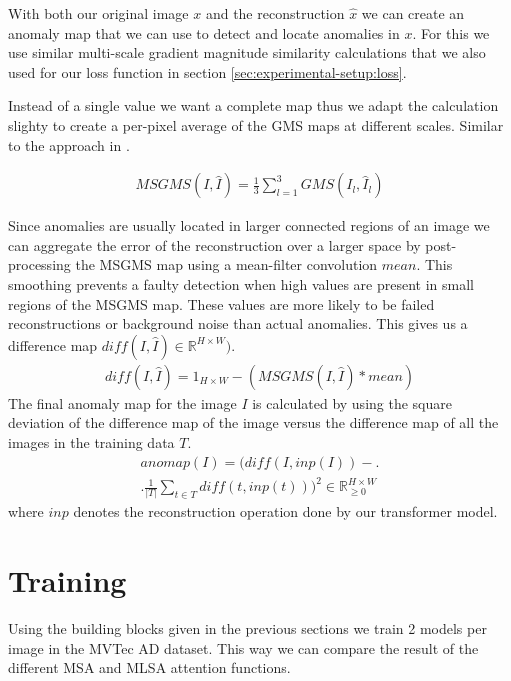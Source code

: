 With both our original image $x$ and the reconstruction $\hat{x}$ we can create an anomaly map that we can use to detect and locate anomalies in $x$. For this we use similar multi-scale gradient magnitude similarity calculations that we also used for our loss function in section \ref{sec:experimental-setup:loss}.

Instead of a single value we want a complete map thus we adapt the calculation slighty to create a per-pixel average of the GMS maps at different scales. Similar to the approach in \cite{pirnay_inpainting_2021, zavrtanik_reconstruction_2021}.

\begin{align}
MSGMS(I, \hat{I}) = \frac{1}{3} \sum_{l=1}^{3} {GMS(I_l, \hat{I}_l)}
\label{eq:experimental-setup:msgms}
\end{align}

Since anomalies are usually located in larger connected regions of an image we can aggregate the error of the reconstruction over a larger space by post-processing the MSGMS map using a mean-filter convolution $mean$. This smoothing prevents a faulty detection when high values are present in small regions of the MSGMS map. These values are more likely to be failed reconstructions or background noise than actual anomalies. This gives us a difference map $diff(I, \hat{I}) \in \mathbb{R}^{H \times W})$.
%
\begin{align}
diff(I, \hat{I}) = 1_{H \times W} - (MSGMS(I, \hat{I}) \ast mean)
\label{eq:experimental-setup:diff}
\end{align}
%
The final anomaly map for the image $I$ is calculated by using the square deviation of the difference map of the image versus the difference map of all the images in the training data $T$.
%
\begin{equation}
\begin{aligned}
anomap(I) = \biggl( {diff}(I, inp(I)) - \bigr. \\
\biggl. \frac{1}{|T|} \sum_{t \in T}{{diff}(t, inp(t))} \Bigr) ^ 2 \in \mathbb{R}_{\geq 0}^{H \times W}
\label{eq:experimental-setup:anomap}
\end{aligned}
\end{equation}
%
where $inp$ denotes the reconstruction operation done by our transformer model.

\section{Training}

Using the building blocks given in the previous sections we train 2 models per image in the MVTec AD dataset. This way we can compare the result of the different MSA and MLSA attention functions.

